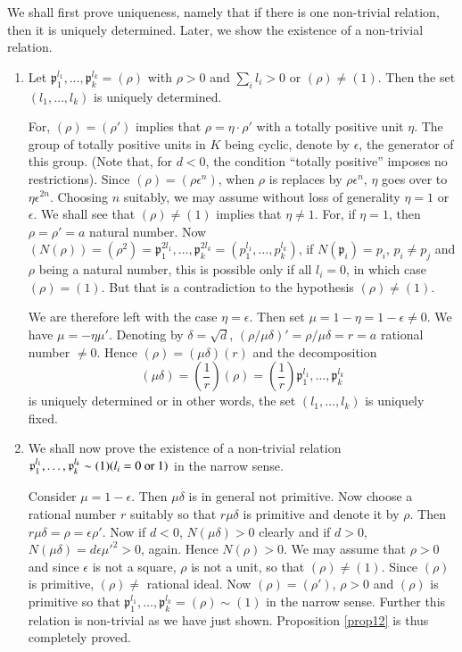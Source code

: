 We shall first prove uniqueness, namely that if there is one
non-trivial relation, then it is uniquely determined. Later, we show
the existence of a non-trivial relation.
\begin{enumerate}
\renewcommand{\theenumi}{\alph{enumi}}
\renewcommand{\labelenumi}{(\theenumi)}
\item Let
  $\mathfrak{p}^{l_{1}}_{1},\ldots,\mathfrak{p}^{l_{k}}_{k}=(\rho)$
  with $\rho>0$ and $\sum\limits_{i}l_{i}>0$ or $(\rho)\neq (1)$. Then
  the set $(l_{1},\ldots,l_{k})$ is uniquely determined.


For, $(\rho)=(\rho')$ implies that $\rho=\eta\cdot\rho'$ with a
totally positive unit $\eta$. The group of totally positive units in
$K$ being cyclic, denote by $\epsilon$, the generator of this
group. (Note that, for $d<0$, the condition ``totally positive''
imposes no restrictions). Since $(\rho)=(\rho\epsilon^{n})$, when
$\rho$ is replaces by $\rho\epsilon^{n}$, $\eta$ goes over to
$\eta\epsilon^{2n}$. Choosing $n$ suitably, we may assume without loss
of generality $\eta=1$ or $\epsilon$. We shall see that $(\rho)\neq
(1)$ implies that $\eta\neq 1$. For, if $\eta=1$, then $\rho=\rho'=a$
natural number. Now
$(N(\rho))=(\rho^{2})=\mathfrak{p}^{2l_{1}}_{1},\ldots,\mathfrak{p}^{2l_{k}}_{k}=(p^{l_{1}}_{1},\ldots,p^{l_{k}}_{k})$,
if $N(\mathfrak{p}_{i})=p_{i}$, $p_{i}\neq p_{j}$ and $\rho$ being a
natural number, this is possible only if all $l_{i}=0$, in which case
$(\rho)=(1)$. But that is a contradiction to the hypothesis
$(\rho)\neq (1)$.

We are therefore left with the case $\eta=\epsilon$. Then set
$\mu=1-\eta=1-\epsilon\neq 0$. We have $\mu=-\eta\mu'$. Denoting by
$\delta=\sqrt{d}$, $(\rho/\mu\delta)'=\rho/\mu\delta=r=a$ rational
number $\neq 0$. Hence $(\rho)=(\mu\delta)(r)$ and the decomposition
$$
(\mu\delta)=\left(\frac{1}{r}\right)(\rho)=\left(\frac{1}{r}\right)\mathfrak{p}^{l_{1}}_{1},\ldots,\mathfrak{p}^{l_{k}}_{k} 
$$\pageoriginale
is uniquely determined or in other words, the set
$(l_{1},\ldots,l_{k})$ is uniquely fixed.

\item We shall now prove the existence of a non-trivial relation
  $\mathfrak{p}^{l_{1}}_{1},\ldots,\break\mathfrak{p}^{l_{k}}_{k}\sim(1)(l_{i}=0\text{
  or } 1)$ in the narrow sense.

Consider $\mu=1-\epsilon$. Then $\mu\delta$ is in general not
primitive. Now choose a rational number $r$ suitably so that
$r\mu\delta$ is primitive and denote it by $\rho$. Then
$r\mu\delta=\rho=\epsilon\rho'$. Now if $d<0$, $N(\mu\delta)>0$
clearly and if $d>0$, $N(\mu\delta)=d\epsilon{\mu'}^{2}>0$,
again. Hence $N(\rho)>0$. We may assume that $\rho>0$ and since
$\epsilon$ is not a square, $\rho$ is not a unit, so that $(\rho)\neq
(1)$. Since $(\rho)$ is primitive, $(\rho)\neq $ rational ideal. Now
$(\rho)=(\rho')$, $\rho>0$ and $(\rho)$ is primitive so that
$\mathfrak{p}^{l_{1}}_{1},\ldots,\mathfrak{p}^{l_{k}}_{k}=(\rho)\sim(1)$
in the narrow sense. Further this relation is non-trivial as we have
just shown. Proposition \ref{prop12} is thus completely proved.


\end{enumerate}

